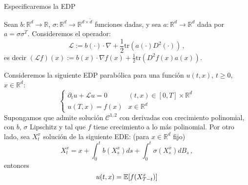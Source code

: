 \newp Especificaremos la EDP
\begin{theorem}
    Sean $b: \mathbb{R}^{d} \to \mathbb{R}$, $\sigma : \mathbb{R}^{d} \to  \mathbb{R}^{d \times \tilde{d}}$ funciones dadas, y sea $a: \mathbb{R}^{d} \to \mathbb{R}^{d}$ dada por $a = \sigma \sigma^T$. Consideremos el operador:
    \begin{equation*}
        \mathcal{L} := b(\cdot) \cdot \nabla + \frac{1}{2} \text{tr}(a(\cdot) D^2 (\cdot )) \,,
    \end{equation*}
    es decir $(\mathcal{L} f)(x) := b(x) \cdot \nabla f(x) + \frac{1}{2} \text{tr}(D^2 f(x) a(x))$.

    \newp Consideremos la siguiente EDP parabólica para una función $u(t,x)$, $t \ge 0$, $x \in \mathbb{R}^{d}$: 
    \begin{equation*}
        \label{eq:sde_11} 
        \tag{1} 
        \begin{cases}
            \partial_t u + \mathcal{L} u = 0 & (t,x) \in [0,T] \times \mathbb{R}^{d} \\ 
                u(T,x) = f(x) & x \in \mathbb{R}^{d}
        \end{cases}
    \end{equation*}
    Supongamos que admite solución $\mathcal{C}^{1,2}$ con derivadas con crecimiento polinomial, con $b$, $\sigma$ Lipschitz y tal que $f$ tiene crecimiento a lo más polinomial. 
    Por otro lado, sea $X_t^{x}$ solución de la siguiente EDE: (para $x \in \mathbb{R}^d$ fijo)
    \begin{equation*}
        \label{eq:sde_12}
        \tag{2}
        X_t^x = x + \int_{0}^{t} b(X_s^x) ds + \int_{0}^{t} \sigma (X_s^x) dB_s \,,
    \end{equation*}
    entonces 
    \begin{equation*}
        u(t,x) = \mathbb{E}[ f (X_{T-t}^{x})]
    \end{equation*}
\end{theorem}

